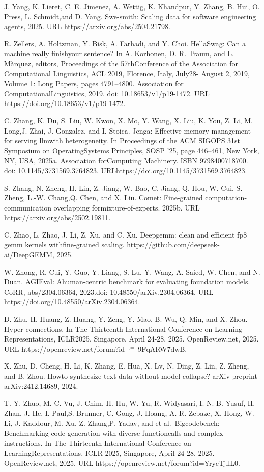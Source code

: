 \documentclass[
  10
]{article}
\begin{document}
J. Yang, K. Lieret, C. E. Jimenez, A. Wettig, K. Khandpur, Y. Zhang, B.
Hui, O. Press, L. Schmidt,and D. Yang. Swe-smith: Scaling data for
software engineering agents, 2025. URL https://arxiv.org/abs/2504.21798.

R. Zellers, A. Holtzman, Y. Bisk, A. Farhadi, and Y. Choi. HellaSwag:
Can a machine really finishyour sentence? In A. Korhonen, D. R. Traum,
and L. Màrquez, editors, Proceedings of the 57thConference of the
Association for Computational Linguistics, ACL 2019, Florence, Italy,
July28- August 2, 2019, Volume 1: Long Papers, pages 4791--4800.
Association for ComputationalLinguistics, 2019. doi:
10.18653/v1/p19-1472. URL https://doi.org/10.18653/v1/p19-1472.

C. Zhang, K. Du, S. Liu, W. Kwon, X. Mo, Y. Wang, X. Liu, K. You, Z. Li,
M. Long,J. Zhai, J. Gonzalez, and I. Stoica. Jenga: Effective memory
management for serving llmwith heterogeneity. In Proceedings of the ACM
SIGOPS 31st Symposium on OperatingSystems Principles, SOSP '25, page
446--461, New York, NY, USA, 2025a. Association forComputing Machinery.
ISBN 9798400718700. doi: 10.1145/3731569.3764823.
URLhttps://doi.org/10.1145/3731569.3764823.

S. Zhang, N. Zheng, H. Lin, Z. Jiang, W. Bao, C. Jiang, Q. Hou, W. Cui,
S. Zheng, L.-W. Chang,Q. Chen, and X. Liu. Comet: Fine-grained
computation-communication overlapping formixture-of-experts. 2025b. URL
https://arxiv.org/abs/2502.19811.

C. Zhao, L. Zhao, J. Li, Z. Xu, and C. Xu. Deepgemm: clean and efficient
fp8 gemm kernels withfine-grained scaling.
https://github.com/deepseek-ai/DeepGEMM, 2025.

W. Zhong, R. Cui, Y. Guo, Y. Liang, S. Lu, Y. Wang, A. Saied, W. Chen,
and N. Duan. AGIEval: Ahuman-centric benchmark for evaluating foundation
models. CoRR, abs/2304.06364, 2023.doi: 10.48550/arXiv.2304.06364. URL
https://doi.org/10.48550/arXiv.2304.06364.

D. Zhu, H. Huang, Z. Huang, Y. Zeng, Y. Mao, B. Wu, Q. Min, and X. Zhou.
Hyper-connections. In The Thirteenth International Conference on
Learning Representations, ICLR2025, Singapore, April 24-28, 2025.
OpenReview.net, 2025. URL https://openreview.net/forum?id
\(\cdot ^ { = }\) 9FqARW7dwB.

X. Zhu, D. Cheng, H. Li, K. Zhang, E. Hua, X. Lv, N. Ding, Z. Lin, Z.
Zheng, and B. Zhou. Howto synthesize text data without model collapse?
arXiv preprint arXiv:2412.14689, 2024.

T. Y. Zhuo, M. C. Vu, J. Chim, H. Hu, W. Yu, R. Widyasari, I. N. B.
Yusuf, H. Zhan, J. He, I. Paul,S. Brunner, C. Gong, J. Hoang, A. R.
Zebaze, X. Hong, W. Li, J. Kaddour, M. Xu, Z. Zhang,P. Yadav, and et
al.~Bigcodebench: Benchmarking code generation with diverse
functioncalls and complex instructions. In The Thirteenth International
Conference on LearningRepresentations, ICLR 2025, Singapore, April
24-28, 2025. OpenReview.net, 2025. URL
https://openreview.net/forum?id=YrycTjllL0.
\end{document}
